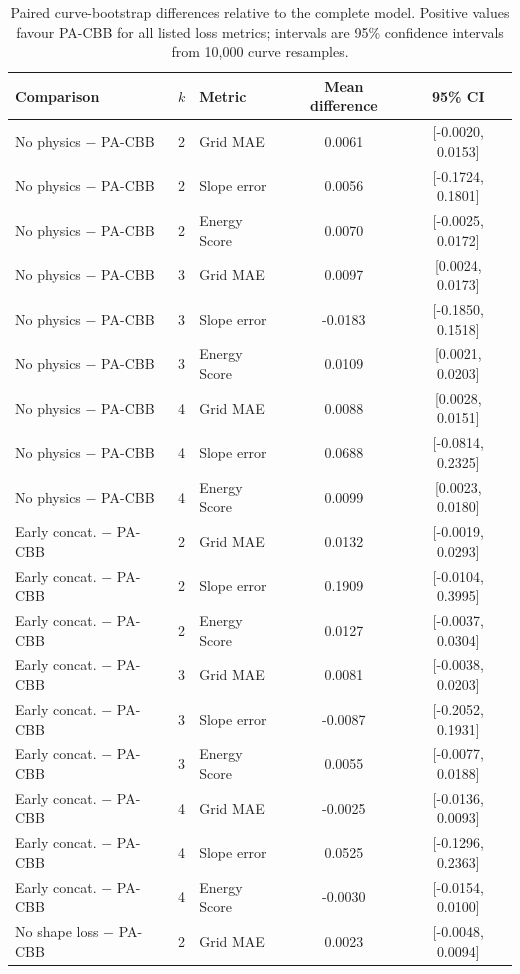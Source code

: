 \begin{table}[t]
\caption{Paired curve-bootstrap differences relative to the complete model. Positive values favour PA-CBB for all listed loss metrics; intervals are 95\% confidence intervals from 10,000 curve resamples.}
\label{tab:ablation_bootstrap}
\centering
\scriptsize
\setlength{\tabcolsep}{6pt}
\begin{tabular}{lclcc}
\toprule
Comparison & $k$ & Metric & Mean difference & 95\% CI \\
\midrule
No physics $-$ PA-CBB & 2 & Grid MAE & 0.0061 & [-0.0020, 0.0153] \\
No physics $-$ PA-CBB & 2 & Slope error & 0.0056 & [-0.1724, 0.1801] \\
No physics $-$ PA-CBB & 2 & Energy Score & 0.0070 & [-0.0025, 0.0172] \\
No physics $-$ PA-CBB & 3 & Grid MAE & 0.0097 & [0.0024, 0.0173] \\
No physics $-$ PA-CBB & 3 & Slope error & -0.0183 & [-0.1850, 0.1518] \\
No physics $-$ PA-CBB & 3 & Energy Score & 0.0109 & [0.0021, 0.0203] \\
No physics $-$ PA-CBB & 4 & Grid MAE & 0.0088 & [0.0028, 0.0151] \\
No physics $-$ PA-CBB & 4 & Slope error & 0.0688 & [-0.0814, 0.2325] \\
No physics $-$ PA-CBB & 4 & Energy Score & 0.0099 & [0.0023, 0.0180] \\
\addlinespace[2pt]
Early concat. $-$ PA-CBB & 2 & Grid MAE & 0.0132 & [-0.0019, 0.0293] \\
Early concat. $-$ PA-CBB & 2 & Slope error & 0.1909 & [-0.0104, 0.3995] \\
Early concat. $-$ PA-CBB & 2 & Energy Score & 0.0127 & [-0.0037, 0.0304] \\
Early concat. $-$ PA-CBB & 3 & Grid MAE & 0.0081 & [-0.0038, 0.0203] \\
Early concat. $-$ PA-CBB & 3 & Slope error & -0.0087 & [-0.2052, 0.1931] \\
Early concat. $-$ PA-CBB & 3 & Energy Score & 0.0055 & [-0.0077, 0.0188] \\
Early concat. $-$ PA-CBB & 4 & Grid MAE & -0.0025 & [-0.0136, 0.0093] \\
Early concat. $-$ PA-CBB & 4 & Slope error & 0.0525 & [-0.1296, 0.2363] \\
Early concat. $-$ PA-CBB & 4 & Energy Score & -0.0030 & [-0.0154, 0.0100] \\
\addlinespace[2pt]
No shape loss $-$ PA-CBB & 2 & Grid MAE & 0.0023 & [-0.0048, 0.0094] \\

\end{tabular}
\end{table}
